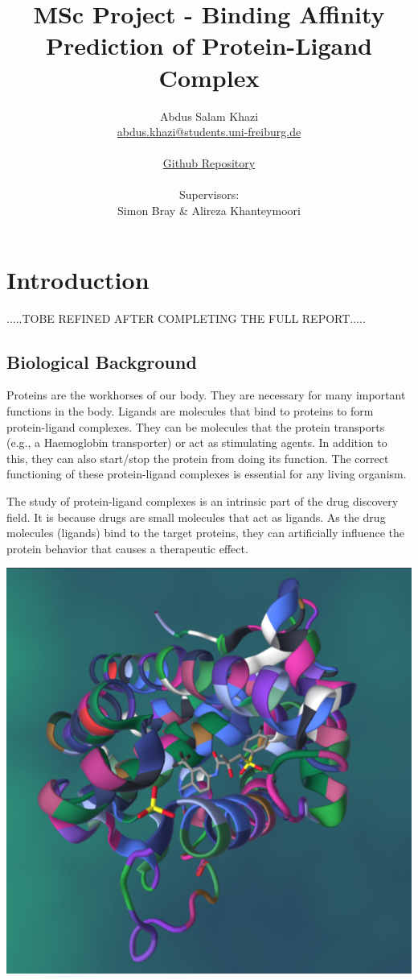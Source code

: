 \documentclass[11pt]{article}
\title{MSc Project - Binding Affinity Prediction of Protein-Ligand Complex}
\author{
        Abdus Salam Khazi\\
        \href{mailto:abdus.khazi@students.uni-freiburg.de}
                {abdus.khazi@students.uni-freiburg.de}\\ \\
        \href{https://github.com/abduskhazi/MSc-Project}
                {Github Repository} \cite{github_repository} \\ \\
        Supervisors:
        \begin{tabular}{ll}
			Simon Bray \&
			Alireza Khanteymoori
		\end{tabular}
       }
\begin{document}
\maketitle
\date{}
\tableofcontents
\newpage

\section{Introduction}
.....TOBE REFINED AFTER COMPLETING THE FULL REPORT.....

\subsection{Biological Background}
Proteins are the workhorses of our body.  They are necessary for many important functions in the body.  Ligands are molecules that bind to proteins to form protein-ligand complexes.  They can be molecules that the protein transports (e.g., a Haemoglobin transporter) or act as stimulating agents.  In addition to this, they can also start/stop the protein from doing its function.  The correct functioning of these protein-ligand complexes is essential for any living organism.

The study of protein-ligand complexes is an intrinsic part of the drug discovery field.  It is because drugs are small molecules that act as ligands.  As the drug molecules (ligands) bind to the target proteins, they can artificially influence the protein behavior that causes a therapeutic effect.

\includegraphics[scale=0.15]{pl_complex}
\cite{PL_complex_introduction}
\end{document}
